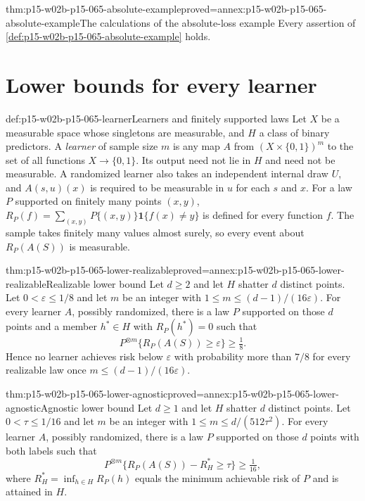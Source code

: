 \begin{hbtheorem}{thm:p15-w02b-p15-065-absolute-example}{proved=annex:p15-w02b-p15-065-absolute-example}{The calculations of the absolute-loss example}
Every assertion of \cref{def:p15-w02b-p15-065-absolute-example} holds.
\end{hbtheorem}

\section{Lower bounds for every learner}
\label{sec:p15-w02b-p15-065-lower}

\begin{hbdefinition}{def:p15-w02b-p15-065-learner}{Learners and finitely supported laws}
Let \(X\) be a measurable space whose singletons are measurable, and \(H\)
a class of binary predictors. A \emph{learner} of sample size \(m\) is any
map \(A\) from \((X\times\{0,1\})^m\) to the set of all functions
\(X\to\{0,1\}\). Its output need not lie in \(H\) and need not be
measurable. A randomized learner also takes an independent internal draw
\(U\), and \(A(s,u)(x)\) is required to be measurable in \(u\) for each
\(s\) and \(x\). For a law \(P\) supported on finitely many points
\((x,y)\), \(R_P(f)=\sum_{(x,y)}P\{(x,y)\}\mathbf1\{f(x)\ne y\}\) is
defined for every function \(f\). The sample takes finitely many values
almost surely, so every event about \(R_P(A(S))\) is measurable.
\end{hbdefinition}

\begin{hbtheorem}{thm:p15-w02b-p15-065-lower-realizable}{proved=annex:p15-w02b-p15-065-lower-realizable}{Realizable lower bound}
Let \(d\geq2\) and let \(H\) shatter \(d\) distinct points. Let
\(0<\varepsilon\leq1/8\) and let \(m\) be an integer with
\(1\leq m\leq(d-1)/(16\varepsilon)\). For every learner \(A\), possibly
randomized, there is a law \(P\) supported on those \(d\) points and a
member \(h^{*}\in H\) with \(R_P(h^{*})=0\) such that
\[
 P^{\otimes m}\{R_P(A(S))\geq\varepsilon\}\geq\tfrac18 .
\]
Hence no learner achieves risk below \(\varepsilon\) with probability more
than \(7/8\) for every realizable law once \(m\leq(d-1)/(16\varepsilon)\).
\end{hbtheorem}

\begin{hbtheorem}{thm:p15-w02b-p15-065-lower-agnostic}{proved=annex:p15-w02b-p15-065-lower-agnostic}{Agnostic lower bound}
Let \(d\geq1\) and let \(H\) shatter \(d\) distinct points. Let
\(0<\tau\leq1/16\) and let \(m\) be an integer with
\(1\leq m\leq d/(512\tau^2)\). For every learner \(A\), possibly
randomized, there is a law \(P\) supported on those \(d\) points with both
labels such that
\[
 P^{\otimes m}\{R_P(A(S))-R_H^{*}\geq\tau\}\geq\tfrac1{16},
\]
where \(R_H^{*}=\inf_{h\in H}R_P(h)\) equals the minimum achievable risk of
\(P\) and is attained in \(H\).
\end{hbtheorem}

